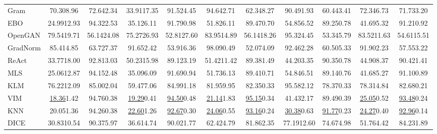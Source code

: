 \documentclass{article} \usepackage{iclr2024_conference,times}
\begin{document}
\begin{table*}[h]
{\begin{tabular}{l cc cc cc cc cc}
			Gram & 70.30{\tiny8.96} & 72.64{\tiny2.34} & 33.91{\tiny17.35} & 91.52{\tiny4.45} & 94.64{\tiny2.71} & 62.34{\tiny8.27} & 90.49{\tiny1.93} & 60.44{\tiny3.41} & 72.34{\tiny6.73} & 71.73{\tiny3.20} \\ 
			EBO & 24.99{\tiny12.93} & 94.32{\tiny2.53} & 35.12{\tiny6.11} & 91.79{\tiny0.98} & 51.82{\tiny6.11} & 89.47{\tiny0.70} & 54.85{\tiny6.52} & 89.25{\tiny0.78} & 41.69{\tiny5.32} & 91.21{\tiny0.92} \\ 
			OpenGAN & 79.54{\tiny19.71} & 56.14{\tiny24.08} & 75.27{\tiny26.93} & 52.81{\tiny27.60} & 83.95{\tiny14.89} & 56.14{\tiny18.26} & 95.32{\tiny4.45} & 53.34{\tiny5.79} & 83.52{\tiny11.63} & 54.61{\tiny15.51} \\ 
			GradNorm & 85.41{\tiny4.85} & 63.72{\tiny7.37} & 91.65{\tiny2.42} & 53.91{\tiny6.36} & 98.09{\tiny0.49} & 52.07{\tiny4.09} & 92.46{\tiny2.28} & 60.50{\tiny5.33} & 91.90{\tiny2.23} & 57.55{\tiny3.22} \\ 
			ReAct & 33.77{\tiny18.00} & 92.81{\tiny3.03} & 50.23{\tiny15.98} & 89.12{\tiny3.19} & 51.42{\tiny11.42} & 89.38{\tiny1.49} & 44.20{\tiny3.35} & 90.35{\tiny0.78} & 44.90{\tiny8.37} & 90.42{\tiny1.41} \\ 
			MLS & 25.06{\tiny12.87} & 94.15{\tiny2.48} & 35.09{\tiny6.09} & 91.69{\tiny0.94} & 51.73{\tiny6.13} & 89.41{\tiny0.71} & 54.84{\tiny6.51} & 89.14{\tiny0.76} & 41.68{\tiny5.27} & 91.10{\tiny0.89} \\ 
			KLM & 76.22{\tiny12.09} & 85.00{\tiny2.04} & 59.47{\tiny7.06} & 84.99{\tiny1.18} & 81.95{\tiny9.95} & 82.35{\tiny0.33} & 95.58{\tiny2.12} & 78.37{\tiny0.33} & 78.31{\tiny4.84} & 82.68{\tiny0.21} \\ 
			VIM & \underline{18.36}{\tiny1.42} & 94.76{\tiny0.38} & \underline{19.29}{\tiny0.41} & \underline{94.50}{\tiny0.48} & \underline{21.14}{\tiny1.83} & \underline{95.15}{\tiny0.34} & 41.43{\tiny2.17} & 89.49{\tiny0.39} & \underline{25.05}{\tiny0.52} & \underline{93.48}{\tiny0.24} \\ 
			KNN & 20.05{\tiny1.36} & 94.26{\tiny0.38} & \underline{22.60}{\tiny1.26} & \underline{92.67}{\tiny0.30} & \underline{24.06}{\tiny0.55} & \underline{93.16}{\tiny0.24} & \underline{30.38}{\tiny0.63} & \underline{91.77}{\tiny0.23} & \underline{24.27}{\tiny0.40} & \underline{92.96}{\tiny0.14} \\ 
			DICE & 30.83{\tiny10.54} & 90.37{\tiny5.97} & 36.61{\tiny4.74} & 90.02{\tiny1.77} & 62.42{\tiny4.79} & 81.86{\tiny2.35} & 77.19{\tiny12.60} & 74.67{\tiny4.98} & 51.76{\tiny4.42} & 84.23{\tiny1.89} \\ 

\end{tabular}}
\end{table*}
\end{document}
